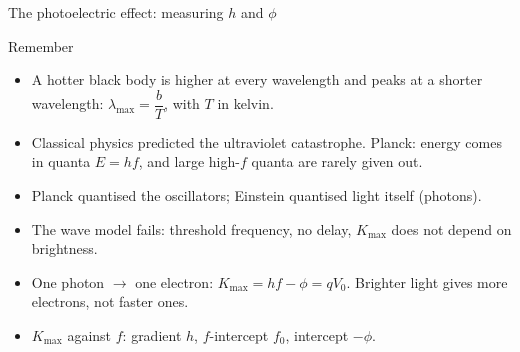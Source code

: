 \begin{experiment}{The photoelectric effect: measuring \texorpdfstring{$h$}{h} and \texorpdfstring{$\phi$}{phi}}
\end{experiment}

\begin{summarybox}{Remember}
\begin{itemize}
  \item A hotter black body is higher at every wavelength and peaks at a shorter
        wavelength: $\lambda_\mathrm{max} = \dfrac{b}{T}$, with $T$ in kelvin.
  \item Classical physics predicted the ultraviolet catastrophe. Planck: energy comes in
        quanta $E = hf$, and large high-$f$ quanta are rarely given out.
  \item Planck quantised the oscillators; Einstein quantised light itself (photons).
  \item The wave model fails: threshold frequency, no delay, $K_\mathrm{max}$ does not
        depend on brightness.
  \item One photon $\to$ one electron: $K_\mathrm{max} = hf - \phi = qV_0$. Brighter
        light gives more electrons, not faster ones.
  \item $K_\mathrm{max}$ against $f$: gradient $h$, $f$-intercept $f_0$, intercept
        $-\phi$.
\end{itemize}
\end{summarybox}
